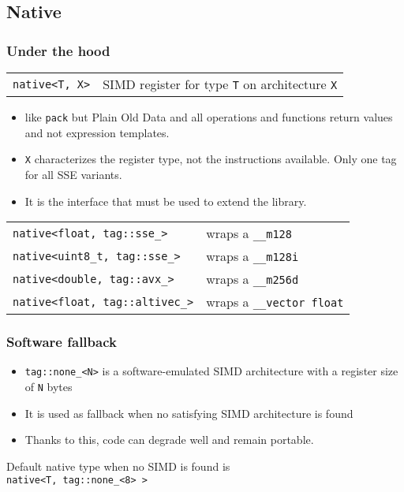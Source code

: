 \documentclass{beamer}
\begin{document}
\subsection{Native}
\begin{frame}
	\frametitle{Under the hood}
	
	\begin{tabular}{ll}
	\lstinline{native<T, X>} & SIMD register for type \lstinline{T} on architecture \lstinline{X}
	\end{tabular}
	\bigskip
	
	\begin{itemize}
		\item like \lstinline{pack} but Plain Old Data and all operations and functions return values and not
		      expression templates.
		\item \lstinline{X} characterizes the register type, not the instructions available. Only one tag for all
		      SSE variants.
		\item It is the interface that must be used to extend the library.
	\end{itemize}
	\bigskip
	
	\begin{tabular}{ll}
	\lstinline{native<float, tag::sse_>} & wraps a \lstinline{__m128}\\
	\lstinline{native<uint8_t, tag::sse_>} & wraps a \lstinline{__m128i}\\
	\lstinline{native<double, tag::avx_>} & wraps a \lstinline{__m256d}\\
	\lstinline{native<float, tag::altivec_>} & wraps a \lstinline{__vector float}
	\end{tabular}
	
\end{frame}

\begin{frame}
	\frametitle{Software fallback}
	
	\begin{itemize}
		\item \lstinline{tag::none_<N>} is a software-emulated SIMD architecture with a register size of \lstinline{N} bytes
		\item It is used as fallback when no satisfying SIMD architecture is found
		\item Thanks to this, code can degrade well and remain portable.
	\end{itemize}
	\bigskip	
	
	Default native type when no SIMD is found is\\
	\hspace{10px}\lstinline{native<T, tag::none_<8> >}
	
\end{frame}
\end{document}
